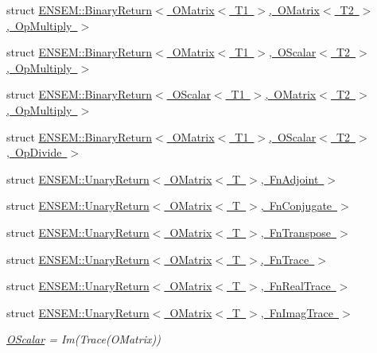 \begin{DoxyCompactItemize}
\item 
struct \mbox{\hyperlink{structENSEM_1_1BinaryReturn_3_01OMatrix_3_01T1_01_4_00_01OMatrix_3_01T2_01_4_00_01OpMultiply_01_4}{E\+N\+S\+E\+M\+::\+Binary\+Return$<$ O\+Matrix$<$ T1 $>$, O\+Matrix$<$ T2 $>$, Op\+Multiply $>$}}
\item 
struct \mbox{\hyperlink{structENSEM_1_1BinaryReturn_3_01OMatrix_3_01T1_01_4_00_01OScalar_3_01T2_01_4_00_01OpMultiply_01_4}{E\+N\+S\+E\+M\+::\+Binary\+Return$<$ O\+Matrix$<$ T1 $>$, O\+Scalar$<$ T2 $>$, Op\+Multiply $>$}}
\item 
struct \mbox{\hyperlink{structENSEM_1_1BinaryReturn_3_01OScalar_3_01T1_01_4_00_01OMatrix_3_01T2_01_4_00_01OpMultiply_01_4}{E\+N\+S\+E\+M\+::\+Binary\+Return$<$ O\+Scalar$<$ T1 $>$, O\+Matrix$<$ T2 $>$, Op\+Multiply $>$}}
\item 
struct \mbox{\hyperlink{structENSEM_1_1BinaryReturn_3_01OMatrix_3_01T1_01_4_00_01OScalar_3_01T2_01_4_00_01OpDivide_01_4}{E\+N\+S\+E\+M\+::\+Binary\+Return$<$ O\+Matrix$<$ T1 $>$, O\+Scalar$<$ T2 $>$, Op\+Divide $>$}}
\item 
struct \mbox{\hyperlink{structENSEM_1_1UnaryReturn_3_01OMatrix_3_01T_01_4_00_01FnAdjoint_01_4}{E\+N\+S\+E\+M\+::\+Unary\+Return$<$ O\+Matrix$<$ T $>$, Fn\+Adjoint $>$}}
\item 
struct \mbox{\hyperlink{structENSEM_1_1UnaryReturn_3_01OMatrix_3_01T_01_4_00_01FnConjugate_01_4}{E\+N\+S\+E\+M\+::\+Unary\+Return$<$ O\+Matrix$<$ T $>$, Fn\+Conjugate $>$}}
\item 
struct \mbox{\hyperlink{structENSEM_1_1UnaryReturn_3_01OMatrix_3_01T_01_4_00_01FnTranspose_01_4}{E\+N\+S\+E\+M\+::\+Unary\+Return$<$ O\+Matrix$<$ T $>$, Fn\+Transpose $>$}}
\item 
struct \mbox{\hyperlink{structENSEM_1_1UnaryReturn_3_01OMatrix_3_01T_01_4_00_01FnTrace_01_4}{E\+N\+S\+E\+M\+::\+Unary\+Return$<$ O\+Matrix$<$ T $>$, Fn\+Trace $>$}}
\item 
struct \mbox{\hyperlink{structENSEM_1_1UnaryReturn_3_01OMatrix_3_01T_01_4_00_01FnRealTrace_01_4}{E\+N\+S\+E\+M\+::\+Unary\+Return$<$ O\+Matrix$<$ T $>$, Fn\+Real\+Trace $>$}}
\item 
struct \mbox{\hyperlink{structENSEM_1_1UnaryReturn_3_01OMatrix_3_01T_01_4_00_01FnImagTrace_01_4}{E\+N\+S\+E\+M\+::\+Unary\+Return$<$ O\+Matrix$<$ T $>$, Fn\+Imag\+Trace $>$}}
\begin{DoxyCompactList}\small\item\em \mbox{\hyperlink{classENSEM_1_1OScalar}{O\+Scalar}} = Im(\+Trace(\+O\+Matrix)) \end{DoxyCompactList}\item 

\end{DoxyCompactItemize}
